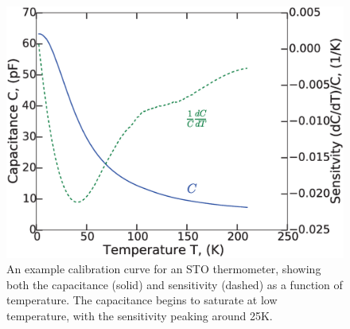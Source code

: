 \documentclass{thesis-umich}
\begin{document}
\begin{figure} \caption[Example STO thermometer calibration]{An example calibration curve for an STO thermometer,
  showing both the capacitance (solid) and sensitivity (dashed) as a function of
temperature. The capacitance begins to saturate at low temperature, with the
sensitivity peaking around 25K. } \label{fig:cal_curve}\centering
\includegraphics[width=\columnwidth]{figures/cvt_apl.eps}
\end{figure}
\end{document}
